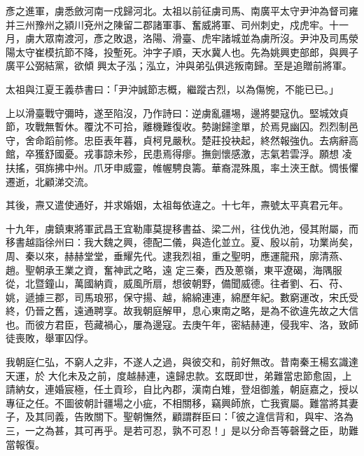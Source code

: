 \begin{pinyinscope}
 彥之進軍，虜悉斂河南一戍歸河北。太祖以前征虜司馬、南廣平太守尹沖為督司雍并三州豫州之潁川兗州之陳留二郡諸軍事、奮威將軍、司州刺史，戍虎牢。十一月，虜大眾南渡河，彥之敗退，洛陽、滑臺、虎牢諸城並為虜所沒。尹沖及司馬滎陽太守崔模抗節不降，投塹死。沖字子順，天水冀人也。先為姚興吏部郎，與興子廣平公弼結黨，欲傾
 興太子泓；泓立，沖與弟弘俱逃叛南歸。至是追贈前將軍。



 太祖與江夏王義恭書曰：「尹沖誠節志概，繼蹤古烈，以為傷惋，不能已已。」



 上以滑臺戰守彌時，遂至陷沒，乃作詩曰：逆虜亂疆埸，邊將嬰寇仇。堅城效貞節，攻戰無暫休。覆沈不可拾，離機難復收。勢謝歸塗單，於焉見幽囚。烈烈制邑守，舍命蹈前修。忠臣表年暮，貞柯見嚴秋。楚莊投袂起，終然報強仇。去病辭高館，卒獲舒國憂。戎事諒未殄，民患焉得瘳。撫劍懷感激，志氣若雲浮。願想
 凌扶搖，弭旆拂中州。爪牙申威靈，帷幄騁良籌。華裔混殊風，率土浹王猷。惆悵懼遷逝，北顧涕交流。



 其後，燾又遣使通好，并求婚姻，太祖每依違之。十七年，燾號太平真君元年。



 十九年，虜鎮東將軍武昌王宜勒庫莫提移書益、梁二州，往伐仇池，侵其附屬，而移書越詣徐州曰：我大魏之興，德配二儀，與造化並立。夏、殷以前，功業尚矣，周、秦以來，赫赫堂堂，垂耀先代。逮我烈祖，重之聖明，應運龍飛，廓清燕、趙。聖朝承王業之資，奮神武之略，遠
 定三秦，西及蔥嶺，東平遼碣，海隅服從，北暨鐘山，萬國納貢，威風所扇，想彼朝野，備聞威德。往者劉、石、苻、姚，遞據三郡，司馬琅邪，保守揚、越，綿綿連連，綿歷年紀。數窮運改，宋氏受終，仍晉之舊，遠通聘享。故我朝庭解甲，息心東南之略，是為不欲違先故之大信也。而彼方君臣，苞藏禍心，屢為邊寇。去庚午年，密結赫連，侵我牢、洛，致師徒喪敗，舉軍囚俘。



 我朝庭仁弘，不窮人之非，不遂人之過，與彼交和，前好無改。昔南秦王楊玄識達天運，於
 大化未及之前，度越赫連，遠歸忠款。玄既即世，弟難當忠節愈固，上請納女，連婚宸極，任土貢珍，自比內郡，漢南白雉，登俎御羞，朝庭嘉之，授以專征之任。不圖彼朝計疆場之小疵，不相關移，竊興師旅，亡我賓屬。難當將其妻子，及其同義，告敗關下。聖朝憮然，顧謂群臣曰：「彼之違信背和，與牢、洛為三，一之為甚，其可再乎。是若可忍，孰不可忍！」是以分命吾等磬聲之臣，助難當報復。




\end{pinyinscope}

